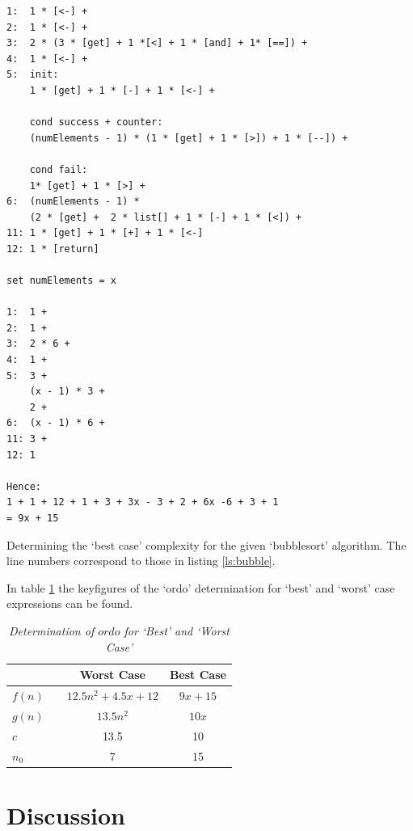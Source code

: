 \documentclass[a4paper,11pt,twoside]{article}
\begin{document}
\begin{listing}
\begin{verbatim}
1:  1 * [<-] +
2:  1 * [<-] +
3:  2 * (3 * [get] + 1 *[<] + 1 * [and] + 1* [==]) +
4:  1 * [<-] +
5:  init:
    1 * [get] + 1 * [-] + 1 * [<-] +

    cond success + counter:
    (numElements - 1) * (1 * [get] + 1 * [>]) + 1 * [--]) +
    
    cond fail:
    1* [get] + 1 * [>] + 
6:  (numElements - 1) * 
    (2 * [get] +  2 * list[] + 1 * [-] + 1 * [<]) +
11: 1 * [get] + 1 * [+] + 1 * [<-]
12: 1 * [return]

set numElements = x

1:  1 +
2:  1 +
3:  2 * 6 +
4:  1 +
5:  3 + 
    (x - 1) * 3 +
    2 +
6:  (x - 1) * 6 +
11: 3 +
12: 1 

Hence:
1 + 1 + 12 + 1 + 3 + 3x - 3 + 2 + 6x -6 + 3 + 1
= 9x + 15

\end{verbatim}
\caption{Determining the `best case' complexity for the given
  `bubblesort' algorithm. The line numbers correspond to those in
  listing \ref{ls:bubble}.\label{ls:best}}
\end{listing}

In table \ref{tab:ordo2} the keyfigures of the `ordo' determination for
`best' and `worst' case expressions can be found. 

\begin{table}[]
\caption{\textit{Determination of $ordo$ for `Best' and `Worst Case'}}
\label{tab:ordo2}
\begin{tabular}{llcc}
&  & Worst Case & Best Case \\ 
\hline
$f(n)$ &  & \multicolumn{1}{c}{$12.5n^2+4.5x+12$} & \multicolumn{1}{c}{$9x+15$} \\
$g(n)$ &  & \multicolumn{1}{c}{$13.5n^2$}         & \multicolumn{1}{c}{$10x$}   \\
$c$    &  & 13.5                                  & 10                          \\
$n_0$  &  & 7                                     & 15                          \\                         
\end{tabular}
\end{table}

\section{Discussion}
\end{document}
